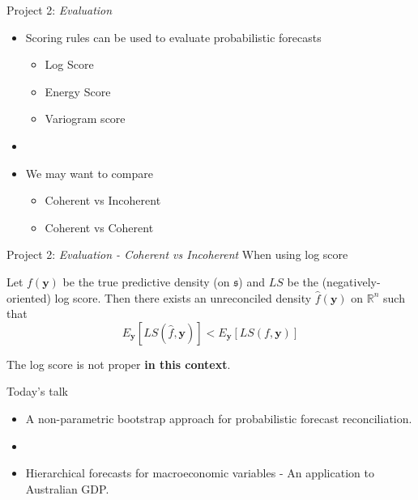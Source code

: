 \documentclass[11pt,xcolor=dvipsnames,table]{beamer} %
\begin{document}
 \begin{frame}{Project 2: \textit{Evaluation}}
\begin{itemize}[<+-| alert@+>]
	\item Scoring rules can be used to evaluate probabilistic forecasts 		\hyperlink{ScoringRules}{\hypertarget{backtoScoringRule}{}} 
	\pause
	\begin{itemize}
		\item Log Score
		\item Energy Score
		\item Variogram score

	\end{itemize}
	\item[]
	\pause
	\item We may want to compare
	\begin{itemize}
		\item Coherent vs Incoherent
		\item Coherent vs Coherent
	\end{itemize}
\end{itemize}
\end{frame}

\begin{frame}{Project 2: \textit{Evaluation - Coherent vs Incoherent}}
When using log score
\begin{theorem}
Let $f(\bm{y})$ be the true predictive density (on $\mathfrak{s}$) and $LS$ be the (negatively-oriented) log score.  Then there exists an unreconciled density  $\hat{f}(\bm{y})$ on $\mathbb{R}^n$ such that
\begin{equation*}
E_{\bm y}\left[LS(\hat{f},\bm{y})\right]<E_{\bm y}\left[LS(f,\bm{y})\right]
\end{equation*}
\end{theorem}
The log score is not proper {\bf in this context}.
\end{frame}


\begin{frame}[noframenumbering]{Today's talk}
\begin{itemize}[<+-| alert@+>]
	\item A non-parametric bootstrap approach for probabilistic forecast reconciliation.
	\item[]
	\item Hierarchical forecasts for macroeconomic variables - An application to Australian GDP.
\end{itemize}    
\end{frame}
\end{document}
